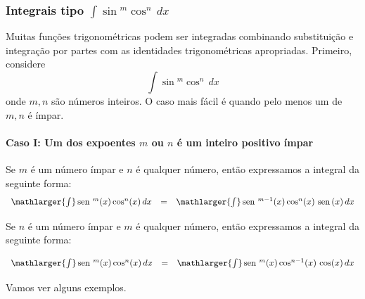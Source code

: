 \cleardoublepage\documentclass[../main.tex]{subfiles}
\begin{document}
\subsubsection{Integrais tipo \texorpdfstring{$\int \sin\!\!^m \cos^n\, dx$}{}}
Muitas funções trigonométricas podem ser integradas combinando substituição e integração
por partes com as identidades trigonométricas apropriadas. Primeiro, considere
$$\int \sin\!\!^m \cos^n\, dx$$
onde $m, n$ são números inteiros. O caso mais fácil é quando pelo menos um de $m, n$ é ímpar. 
\paragraph*{Caso I: Um dos expoentes \(m\) ou \(n\) é um inteiro positivo ímpar}
\begin{compactenum}[i.]
\item Se \(m\) é um número ímpar e \(n\) é qualquer número, então expressamos a integral da seguinte forma:
\[ \begin{array}{lcl} \mathlarger{\int}\sen^m(x) \cos^n(x)\,dx &=& \mathlarger{\int}\sen^{m-1}( x) \cos^n (x)\,\sen (x)\,dx\end{array} \]
\item Se \(n\) é um número ímpar e \(m\) é qualquer número, então expressamos a integral da seguinte forma:

\[ \begin{array}{lcl} \mathlarger{\int}\sen^m (x) \cos^n(x)\,dx &=& \mathlarger{\int}\sen^{m}( x) \cos^{n-1} (x)\,\cos (x)\,dx\\ \end{array} \]
\end{compactenum}
Vamos ver alguns exemplos.
\end{document}
